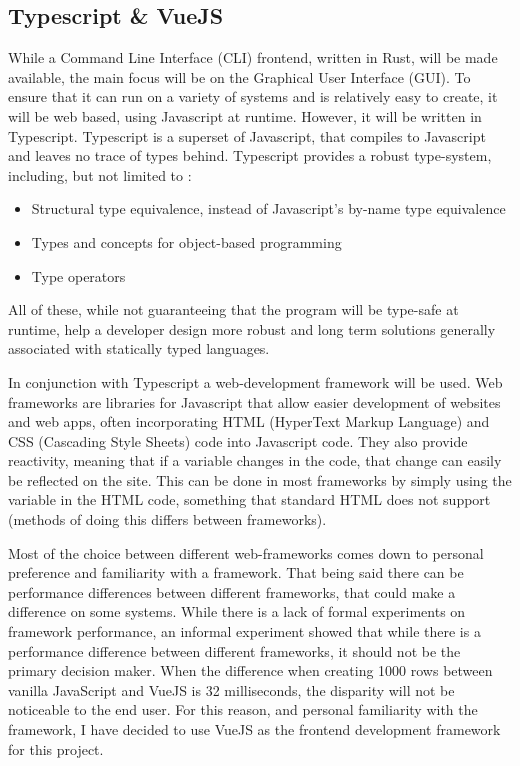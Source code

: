 \subsection{Typescript \& VueJS} \label{sec:chap3:technology:ts}
While a Command Line Interface (CLI) frontend, written in Rust, will be made available, the main focus will be on the Graphical User Interface (GUI). To ensure that it can run on a variety of systems and is relatively easy to create, it will be web based, using Javascript at runtime. However, it will be written in Typescript. Typescript is a superset of Javascript, that compiles to Javascript and leaves no trace of types behind. Typescript provides a robust type-system, including, but not limited to \cite{understandingTypescript}:
\begin{itemize}
    \item Structural type equivalence, instead of Javascript's by-name type equivalence
    \item Types and concepts for object-based programming
    \item Type operators
\end{itemize}
All of these, while not guaranteeing that the program will be type-safe at runtime, help a developer design more robust and long term solutions generally associated with statically typed languages.

In conjunction with Typescript a web-development framework will be used. Web frameworks are libraries for Javascript that allow easier development of websites and web apps, often incorporating HTML (HyperText Markup Language) and CSS (Cascading Style Sheets) code into Javascript code. They also provide reactivity, meaning that if a variable changes in the code, that change can easily be reflected on the site. This can be done in most frameworks by simply using the variable in the HTML code, something that standard HTML does not support (methods of doing this differs between frameworks).

Most of the choice between different web-frameworks comes down to personal preference and familiarity with a framework. That being said there can be performance differences between different frameworks, that could make a difference on some systems. While there is a lack of formal experiments on framework performance, an informal experiment \cite{performanceComparisonJS} showed that while there is a performance difference between different frameworks, it should not be the primary decision maker. When the difference when creating 1000 rows between vanilla JavaScript and VueJS is 32 milliseconds, the disparity will not be noticeable to the end user. For this reason, and personal familiarity with the framework, I have decided to use VueJS as the frontend development framework for this project.

